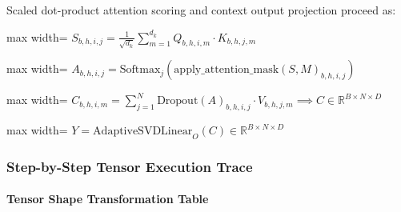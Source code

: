Scaled dot-product attention scoring and context output projection proceed as:

\begin{center}
\begin{adjustbox}{max width=\columnwidth}
$\displaystyle
S_{b, h, i, j} = \frac{1}{\sqrt{d_k}} \sum_{m=1}^{d_k} Q_{b, h, i, m} \cdot K_{b, h, j, m}
$
\end{adjustbox}
\end{center}
\begin{center}
\begin{adjustbox}{max width=\columnwidth}
$\displaystyle
A_{b, h, i, j} = \text{Softmax}_j (\text{apply\_attention\_mask}(S, M)_{b, h, i, j})
$
\end{adjustbox}
\end{center}
\begin{center}
\begin{adjustbox}{max width=\columnwidth}
$\displaystyle
C_{b, h, i, m} = \sum_{j=1}^N \text{Dropout}(A)_{b, h, i, j} \cdot V_{b, h, j, m} \implies C \in \mathbb{R}^{B \times N \times D}
$
\end{adjustbox}
\end{center}
\begin{center}
\begin{adjustbox}{max width=\columnwidth}
$\displaystyle
Y = \text{AdaptiveSVDLinear}_O(C) \in \mathbb{R}^{B \times N \times D}
$
\end{adjustbox}
\end{center}


\subsubsection*{Step-by-Step Tensor Execution Trace}

\paragraph{Tensor Shape Transformation Table}

